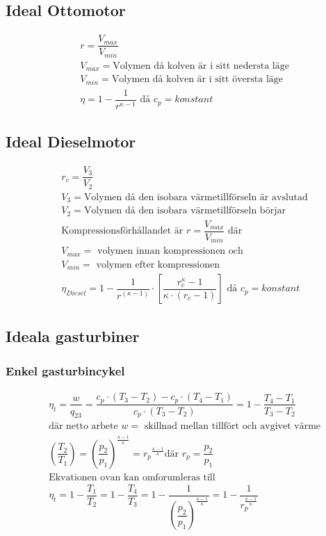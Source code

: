 \subsection*{Ideal Ottomotor}
\begin{align*}
	&r = \dfrac{V_{max}}{V_{min}} \\
	&V_{max} = \text{Volymen då kolven är i sitt nedersta läge} \\
	&V_{min} = \text{Volymen då kolven är i sitt översta läge} \\
	&\eta = 1- \dfrac{1}{r^{\kappa - 1}} \text{ då } c_p = \textit{konstant}
\end{align*}
\subsection*{Ideal Dieselmotor}
\begin{align*}
	&r_c = \dfrac{V_{3}}{V_{2}} \\
	&V_{3} = \text{Volymen då den isobara värmetillförseln är avslutad} \\
	&V_{2} = \text{Volymen då den isobara värmetillförseln börjar}\\
	&\text{Kompressionsförhållandet är } r = \dfrac{V_{max}}{V_{min}} \text{ där} \\
	&V_{max} = \text{ volymen innan kompressionen och} \\
	&V_{min} = \text{ volymen efter kompressionen} \\
	&\eta_{Diesel} = 1 -  \dfrac{1}{r^{(\kappa - 1)}} \cdot \left[\dfrac{r_c^\kappa - 1}{\kappa \cdot (r_c -1)} \right] \text{ då } c_p = \textit{konstant}
\end{align*}
\subsection*{Ideala gasturbiner}
\subsubsection*{Enkel gasturbincykel}
\begin{align*}
&\eta_t = \dfrac{w}{q_{23}}  = \dfrac{c_p \cdot (T_3 - T_2) - c_p\cdot (T_4 - T_1)} {c_p \cdot (T_3 - T_2)} = 1 - \dfrac{T_4 - T_1}{T_3 - T_2} \\
&\text{där netto arbete } w = \text{ skillnad mellan tillfört och avgivet värme}\\
&\left( \dfrac{T_2}{T_1} \right) = \left( \dfrac{p_2}{p_1} \right)^{\frac{\kappa -1 }{\kappa}} = {r_p}^{\frac{\kappa -1 }{\kappa}} \text{där } r_p = \dfrac{p_2}{p_1}\\
& \text{Ekvationen ovan kan omforumleras till}\\
&\eta_t = 1 - \dfrac{T_1}{T_2} = 1 - \dfrac{T_4}{T_3} = 1 - \dfrac{1}{\left( \dfrac{p_2}{p_1} \right)^{\frac{\kappa - 1}{\kappa}}}  =  1 - \dfrac{1}{r_p^{\frac{\kappa - 1}{\kappa}}} 
\end{align*}
